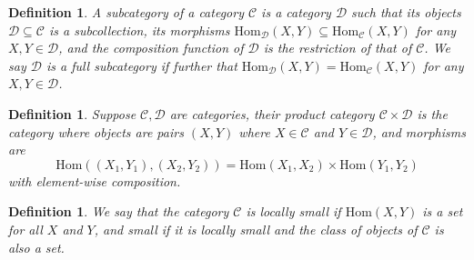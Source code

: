 \documentclass[10pt]{book}
\theoremstyle{bookplain}
\theoremstyle{bookdefinition}
\newtheorem{definition}[theorem]{Definition}
\theoremstyle{bookremark}
\begin{document}
\begin{definition}A \textit{subcategory} of a category $\mathscr{C}$ is a category $\mathscr{D}$ such that its objects $\mathscr{D}\subseteq \mathscr{C}$ is a subcollection, its morphisms $\mathrm{Hom}_{\mathscr{D}}(X,Y)\subseteq \mathrm{Hom}_{\mathscr{C}}(X,Y)$ for any $X,Y\in\mathscr{D}$, and the composition function of $\mathscr{D}$ is the restriction of that of $\mathscr{C}$. We say $\mathscr{D}$ is a \textit{full subcategory} if further that  $\mathrm{Hom}_{\mathscr{D}}(X,Y)= \mathrm{Hom}_{\mathscr{C}}(X,Y)$ for any $X,Y\in\mathscr{D}$. 
\end{definition}
\begin{definition}Suppose $\mathscr{C},\mathscr{D}$ are categories, their product category $\mathscr{C}\times \mathscr{D}$ is the category where objects are pairs $(X,Y)$ where $X\in \mathscr{C}$ and $Y\in \mathscr{D}$, and morphisms are 
    \[\mathrm{Hom}((X_1,Y_1),(X_2,Y_2))=\mathrm{Hom}(X_1,X_2)\times \mathrm{Hom}(Y_1,Y_2)\]
    with element-wise composition. 
\end{definition}



\begin{definition}
    We say that the category $\mathscr{C}$ is \textit{locally small} if $\mathrm{Hom}(X,Y)$ is a set for all $X$ and $Y$, and \textit{small} if it is locally small and the class of objects of $\mathscr{C}$ is also a set. 
\end{definition}
\end{document}
